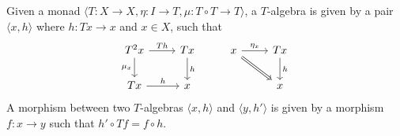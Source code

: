 \documentclass[acmsmall,screen, nonacm, anonymous]{acmart}
\begin{document}
\begin{definition}[$T$-algebra]

Given a monad $\langle T : X \to X, \eta : I \to T, \mu : T \circ T \to T \rangle$, a $T$-algebra is given by a pair $\langle x, h \rangle$ where $h : Tx \to x$ and $x \in X$, such that
\[
    \begin{tikzcd}
        T^2x \arrow[r, "Th"] \arrow[d, "\mu_{x}"'] & Tx \arrow[d, "h"] & x \arrow[r, "\eta_{x}"] \arrow[rd, no head, Rightarrow] & Tx \arrow[d, "h"] \\
        Tx \arrow[r, "h"]                          & x                 &                                                         & x                
    \end{tikzcd}
\]
A morphism between two $T$-algebras $\langle x , h \rangle$ and $\langle y, h' \rangle$ is given by a morphism $f : x \to y$ such that $h' \circ Tf = f \circ h$.
\end{definition}
\end{document}
